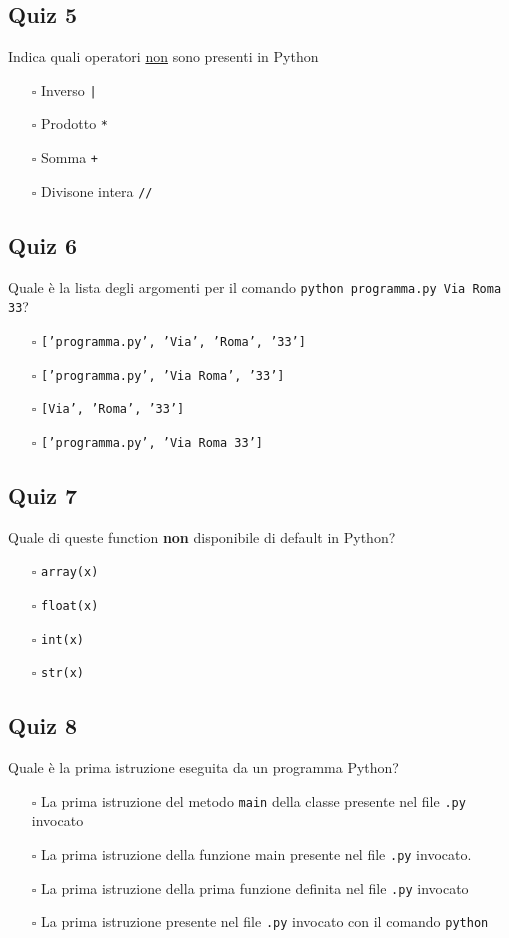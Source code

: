 \documentclass{article}
\begin{document}
\subsection*{Quiz 5}
Indica quali operatori \underline{non} sono presenti in Python
\begin{itemize}
  \item[$\square$] Inverso \texttt{|}
  \item[$\square$] Prodotto \texttt{*}
  \item[$\square$] Somma \texttt{+}
  \item[$\square$] Divisone intera \texttt{//}
\end{itemize}
\subsection*{Quiz 6}
Quale è la lista degli argomenti per il comando \texttt{python programma.py Via Roma 33}?
\begin{itemize}
  \item[$\square$] \texttt{['programma.py', 'Via', 'Roma', '33']}
  \item[$\square$] \texttt{['programma.py', 'Via Roma', '33']}
  \item[$\square$] \texttt{[Via', 'Roma', '33']}
  \item[$\square$] \texttt{['programma.py', 'Via Roma 33']}
\end{itemize}
\subsection*{Quiz 7}
Quale di queste function \textbf{non} disponibile di default in Python?
\begin{itemize}
  \item[$\square$] \texttt{array(x)}
  \item[$\square$] \texttt{float(x)}
  \item[$\square$] \texttt{int(x)}
  \item[$\square$] \texttt{str(x)}
\end{itemize}
\subsection*{Quiz 8}
Quale è la prima istruzione eseguita da un programma Python?
\begin{itemize}
  \item[$\square$] La prima istruzione del metodo \texttt{main} della classe presente nel file \texttt{.py} invocato
  \item[$\square$] La prima istruzione della funzione main presente nel file \texttt{.py} invocato.
  \item[$\square$] La prima istruzione della prima funzione definita nel file \texttt{.py} invocato
  \item[$\square$] La prima istruzione presente nel file \texttt{.py} invocato con il comando \texttt{python}
\end{itemize}
\end{document}
